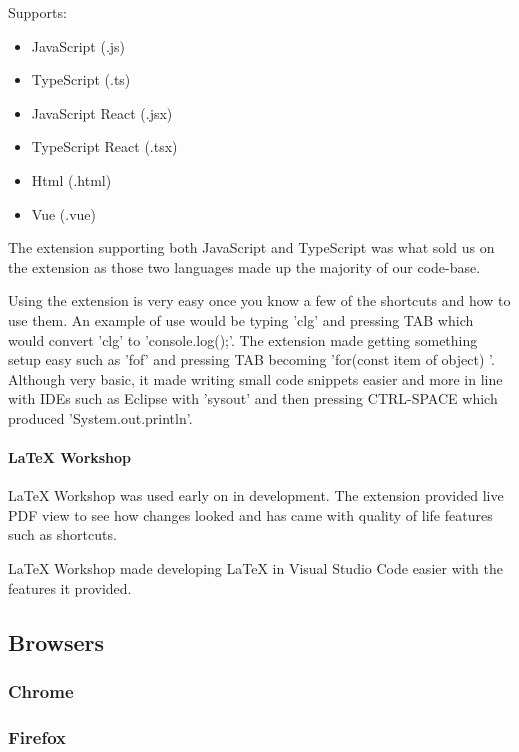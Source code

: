Supports:
\begin{itemize}
    \item JavaScript (.js)
    \item TypeScript (.ts)
    \item JavaScript React (.jsx)
    \item TypeScript React (.tsx)
    \item Html (.html)
    \item Vue (.vue)
\end{itemize}

The extension supporting both JavaScript and TypeScript was what sold us on the extension as those two languages made up the majority of our code-base. 

Using the extension is very easy once you know a few of the shortcuts and how to use them. An example of use would be typing 'clg' and pressing TAB which would convert 'clg' to 'console.log();'. The extension made getting something setup easy such as 'fof' and pressing TAB becoming 'for(const item of object) {}'. Although very basic, it made writing small code snippets easier and more in line with IDEs such as Eclipse with 'sysout' and then pressing CTRL-SPACE which produced 'System.out.println'.

\paragraph{LaTeX Workshop}
LaTeX Workshop was used early on in development. The extension provided live PDF view to see how changes looked and has came with quality of life features such as shortcuts.

LaTeX Workshop made developing LaTeX in Visual Studio Code easier with the features it provided.

\subsection{Browsers}

\subsubsection{Chrome}

\subsubsection{Firefox}